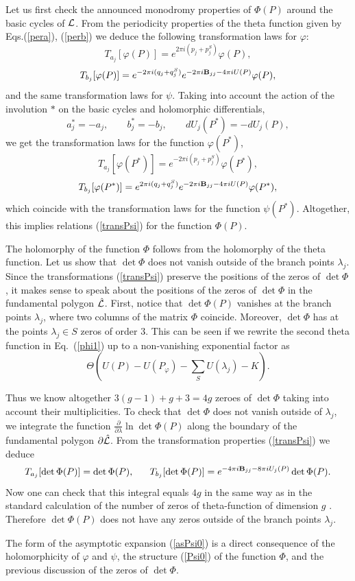 \documentclass[11pt]{article}
\def\be{\begin{equation}}
\def\ee{\end{equation}}
\def\ben{\begin{displaymath}}
\def\een{\end{displaymath}}
\def\l{\lambda}
\def\Th{\Theta}
\def\phi{\varphi}
\def\B{{\bf B}}
\def\f{\frac}
\def\L{{\cal L}}
\def\p{\partial}
\def\0{S}
\def\log{\ln}
\begin{document}
Let us first check the announced monodromy properties of $\Phi(P)$ around the basic cycles of $\L$. 
{}From the periodicity properties of the theta function given by Eqs.(\ref{pera}),
(\ref{perb}) we deduce the following transformation laws for
$\phi$:
\be
T_{a_j}[\phi(P)]=e^{2\pi i (p_j+p^\0_j)}\phi(P),
\ee
\be
T_{b_j}[\phi(P)]=e^{-2\pi i (q_j+ q^\0_j)}e^{-2\pi i\B_{jj}-4\pi i U(P)} 
\phi(P),
\ee
and the same transformation laws for $\psi$.
Taking into account the action of the involution $*$ on the basic cycles and 
holomorphic differentials, 
\be
a_j^* = -a_j,\;\;\;\;\;\;\;b_j^* = -b_j,\;\;\;\;\;\;\; dU_j(P^*)=-dU_j(P),
\ee
we get the transformation laws for the function
$\phi(P^*)$,
\be
T_{a_j}[\phi(P^*)]=e^{-2\pi i (p_j+p^\0_j)}\phi(P^*),
\ee
\be
T_{b_j}[\phi(P^*)]=
e^{2\pi i (q_j+q^\0_j)}e^{-2\pi i\B_{jj}-4\pi i U(P)} \phi(P^*),
\ee
which coincide with the transformation laws for the function $\psi(P^*)$.
Altogether, this implies relations (\ref{transPsi}) for the
function $\Phi(P)$.

The holomorphy of the function $\Phi$ follows from the holomorphy of the theta function.
Let us show that  $\det\Phi$ does not vanish outside of the branch points $\l_j$. Since the transformations  (\ref{transPsi}) preserve the positions of the zeros of $\det\Phi$, it makes sense to speak about the positions of the zeros of  $\det\Phi$ in the
fundamental polygon $\hat{\L}$. First, notice that 
$\det\Phi(P)$ vanishes at the branch points $\l_j$, where two columns of the matrix $\Phi$ coincide. Moreover, $\det\Phi$ has at the points $\l_j\in S$ zeros of order 3. This can be seen if we rewrite the second theta function in Eq.~(\ref{phi1}) up to a non-vanishing exponential factor as
\ben
\Th(U(P)-U(P_\phi)-\sum_{S} U(\l_j)-K).
\een


Thus we know altogether $3(g-1)+g+3=4g$ zeroes of  $\det\Phi$ taking into account their multiplicities. To check that $\det\Phi$ does not vanish outside of $\l_j$, we integrate the function $\f{\p}{\p\l}\log\det\Phi(P)$ along the boundary of the fundamental polygon $\p\hat{\L}$. {}From the transformation properties (\ref{transPsi}) we deduce
\be
T_{a_j}[\det\Phi(P)]=\det\Phi(P),\;\;\;\;\;\;
T_{b_j}[\det\Phi(P)]=e^{-4\pi i \B_{jj}-8\pi i U_j(P)}\det\Phi(P).
\ee
Now one can check that this integral equals $4g$ in the same way as in the standard calculation of the number of zeros of theta-function of dimension $g$ \cite{Mum}. Therefore $\det\Phi(P)$ does not have any zeros outside of the branch points $\l_j$.
 
The form of the asymptotic expansion (\ref{asPsi0}) is a direct consequence of the holomorphicity of $\phi$ and $\psi$, the structure (\ref{Psi0}) of the function $\Phi$, and the previous discussion of the zeros of $\det\Phi$.  
\vskip0.5cm
\end{document}
